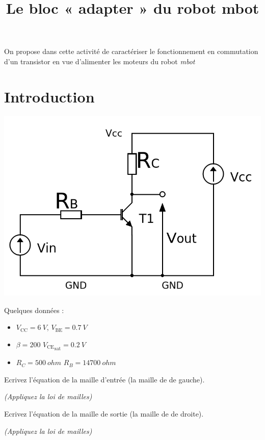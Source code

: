 \documentclass[10pt,fleqn]{article} %
\title{Le bloc « adapter » du robot mbot}
\date{}
\begin{document}
\maketitle
\chapterimage{}
%
\begin{obj}
  On propose dans cette activité de caractériser le fonctionnement en commutation d'un transistor en vue d'alimenter les moteurs du robot \textit{mbot}
\end{obj}
\section{Introduction}
  \begin{center}
    \includegraphics[width=.7\textwidth]{images/transistors}
  \end{center}
  Quelques données :
  \begin{itemize}
    \item $V_\text{CC} = \SI{6}{V}$, \hspace{3cm} $V_\text{BE} = \SI{0.7}{V}$
    \item $\beta = \num{200}$ \hspace{3cm} ${V_\text{CE}}_\text{sat} = \SI{0.2}{V}$
    \item $R_C = \SI{500}{ohm}$ \hspace{3cm} $R_B = \SI{14700}{ohm}$
  \end{itemize}
\begin{question}
  Ecrivez l'équation de la maille d'entrée (la maille de de gauche).

  \textit{(Appliquez la loi de mailles)}
\end{question}
\begin{question}
  Ecrivez l'équation de la maille de sortie (la maille de de droite).

  \textit{(Appliquez la loi de mailles)}
\end{question}
\end{document}
